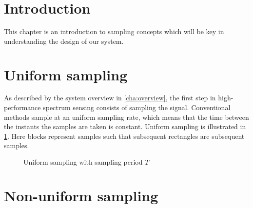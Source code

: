 \documentclass[a4paper, openany, oneside]{memoir}
\begin{document}
\section{Introduction}
This chapter is an introduction to sampling concepts which will be key in understanding the design of our system.
\section{Uniform sampling}
As described by the system overview in \cref{cha:overview}, the first step in high-performance spectrum sensing consists of sampling the signal. Conventional methods sample at an uniform sampling rate, which means that the time between the instants the samples are taken is constant. Uniform sampling is illustrated in \cref{tkz:uniform}. Here blocks represent samples such that subsequent rectangles are subsequent samples.

\begin{figure}[H]
\centering
{}
\caption{Uniform sampling with sampling period $T$}\label{tkz:uniform}
\end{figure}

\section{Non-uniform sampling}
\end{document}
